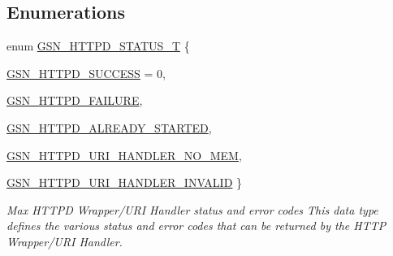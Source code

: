 \subsection*{Enumerations}
\begin{DoxyCompactItemize}
\item 
enum \hyperlink{a00666_ga97ddf6ff1568f9984c83a2161cd9f49d}{GSN\_\-HTTPD\_\-STATUS\_\-T} \{ \par
\hyperlink{a00666_gga97ddf6ff1568f9984c83a2161cd9f49dac44d80d13effc5b74cb543f72c08049c}{GSN\_\-HTTPD\_\-SUCCESS} =  0, 
\par
\hyperlink{a00666_gga97ddf6ff1568f9984c83a2161cd9f49da8780e55822019c621b341656612915f3}{GSN\_\-HTTPD\_\-FAILURE}, 
\par
\hyperlink{a00666_gga97ddf6ff1568f9984c83a2161cd9f49da698a2fe2a47b1082d5e063eef0eeb193}{GSN\_\-HTTPD\_\-ALREADY\_\-STARTED}, 
\par
\hyperlink{a00666_gga97ddf6ff1568f9984c83a2161cd9f49da5018ed43ccffdb7c736b44d1e5c7f378}{GSN\_\-HTTPD\_\-URI\_\-HANDLER\_\-NO\_\-MEM}, 
\par
\hyperlink{a00666_gga97ddf6ff1568f9984c83a2161cd9f49da332145bf766def5f742322a03ea27835}{GSN\_\-HTTPD\_\-URI\_\-HANDLER\_\-INVALID}
 \}
\begin{DoxyCompactList}\small\item\em Max HTTPD Wrapper/URI Handler status and error codes This data type defines the various status and error codes that can be returned by the HTTP Wrapper/URI Handler. \end{DoxyCompactList}\end{DoxyCompactItemize}
